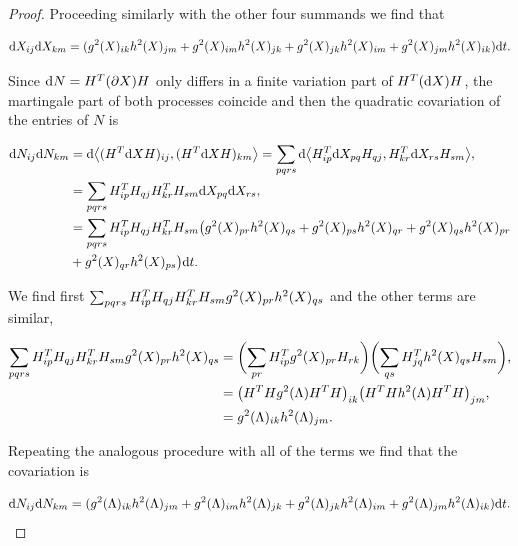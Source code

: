 \begin{proof}
    Proceeding similarly with the other four summands we find that

    \begin{align*}
        \mathrm d X_{ij} \mathrm d X_{km} = (g^2(X)_{ik}h^2(X)_{jm} + g^2(X)_{im}h^2(X)_{jk} + g^2(X)_{jk}h^2(X)_{im} + g^2(X)_{jm}h^2(X)_{ik})\mathrm d t.
    \end{align*}

    Since $\mathrm d N = H^T(\partial X)H$ only differs in a finite variation part of $H^T(\mathrm d X) H$, the martingale part of both processes coincide and then the quadratic covariation of the entries of $N$ is

    \begin{align*}
        \mathrm d N_{ij}\mathrm d N_{km} &= \mathrm d \bigl< (H^T\mathrm d X H)_{ij},(H^T \mathrm d X H)_{km} \bigr> = \sum_{pqrs} \mathrm d\bigl< H^T_{ip}\mathrm d X_{pq} H_{qj}, H^T_{kr}\mathrm d X_{rs} H_{sm} \bigr>, \\
        &= \sum_{pqrs} H^T_{ip}H_{qj}H^T_{kr}H_{sm}\mathrm d X_{pq} \mathrm d X_{rs},\\ 
        &= \sum_{pqrs} H^T_{ip}H_{qj}H^T_{kr}H_{sm}\bigl(g^2(X)_{pr}h^2(X)_{qs} + g^2(X)_{ps}h^2(X)_{qr} + g^2(X)_{qs}h^2(X)_{pr} \\ 
        &+ g^2(X)_{qr}h^2(X)_{ps}\bigr)\mathrm d t.
    \end{align*}

    We find first $\sum_{pqrs} H^T_{ip}H_{qj}H^T_{kr}H_{sm}g^2(X)_{pr}h^2(X)_{qs}$ and the other terms are similar,

    \begin{align*}
        \sum_{pqrs} H^T_{ip}H_{qj}H^T_{kr}H_{sm}g^2(X)_{pr}h^2(X)_{qs} &= \biggl(\sum_{pr}H^T_{ip}g^2(X)_{pr}H_{rk}\biggr)\biggl(\sum_{qs}H^T_{jq}h^2(X)_{qs}H_{sm}\biggr),\\
        &= \bigl( H^THg^2(\Lambda)H^TH\bigr)_{ik}\bigl(H^THh^2(\Lambda)H^TH\bigr)_{jm},\\ 
        &= g^2(\Lambda)_{ik}h^2(\Lambda)_{jm}.
    \end{align*}

    Repeating the analogous procedure with all of the terms we find that the covariation is

    \begin{equation*} \label{eq:quadvarN}
        \mathrm d N_{ij}\mathrm d N_{km} = (g^2(\Lambda)_{ik}h^2(\Lambda)_{jm} + g^2(\Lambda)_{im}h^2(\Lambda)_{jk} + g^2(\Lambda)_{jk}h^2(\Lambda)_{im} + g^2(\Lambda)_{jm}h^2(\Lambda)_{ik})\mathrm d t.
    \end{equation*}


\end{proof}
